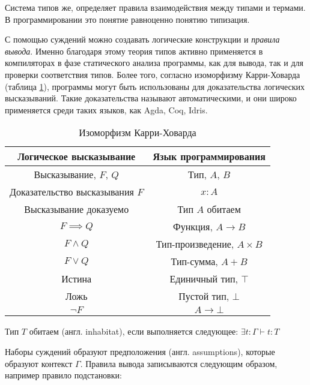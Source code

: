 Система типов же, определяет правила взаимодействия между типами и термами.
В программировании это понятие равноценно понятию типизация.

С помощью суждений можно создавать логические конструкции и \textit{правила вывода}.
Именно благодаря этому теория типов активно применяется в компиляторах в фазе статического анализа программы, как для вывода, так и для проверки соответствия типов.
Более того, согласно изоморфизму Карри-Ховарда~\cite{TypeTheoryArticle} (таблица \ref{tab:curry-hovard-iso}), программы могут быть использованы для доказательства логических высказываний.
Такие доказательства называют автоматическими, и они широко применяется среди таких языков, как Agda, Coq, Idris.

\begin{table}[h]
    \centering
    \caption{Изоморфизм Карри-Ховарда}
    \label{tab:curry-hovard-iso}
    \begin{tabular}{|c|c|}
        \hline
        \textbf{Логическое высказывание} & \textbf{Язык программирования} \\\hline
        Высказывание, $F$, $Q$           & Тип, $A$, $B$                  \\\hline
        Доказательство высказывания $F$  & $x: A$                         \\\hline
        Высказывание доказуемо           & Тип $A$ обитаем                \\\hline
        $F \implies Q$                   & Функция, $A \to B$             \\\hline
        $F \wedge Q$                     & Тип-произведение, $A \times B$ \\\hline
        $F \vee Q$                       & Тип-сумма, $A + B$             \\\hline
        Истина                           & Единичный тип, $\top$          \\\hline
        Ложь                             & Пустой тип, $\bot$             \\\hline
        $\neg F$                         & $A \to \bot$                   \\\hline
    \end{tabular}
\end{table}

Тип $T$ обитаем (англ. inhabitat), если выполняется следующее: $\exists t: \Gamma \vdash t: T$

Наборы суждений образуют предположения (англ. assumptions), которые образуют контекст $\Gamma$.
Правила вывода записываются следующим образом, например правило подстановки:

